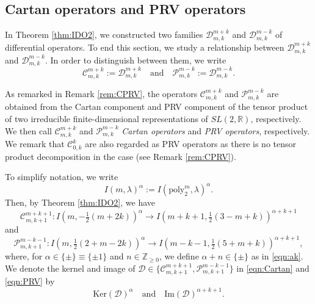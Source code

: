 \documentclass[reqno,11pt]{amsart}
\theoremstyle{remark}
\numberwithin{equation}{section}
\newcommand{\ga}{\alpha}
\newcommand{\R}{\mathbb{R}}
\newcommand{\Z}{\mathbb{Z}}
\newcommand{\Cal}{\mathcal}
\renewcommand{\Im}{\mathrm{Im}}
\newcommand{\poly}{\mathrm{poly}}
\newcommand{\To}{\longrightarrow}
\newcommand{\D}{\Cal{D}}
\newcommand{\Ker}{\mathrm{Ker}}
\begin{document}
\subsection{Cartan operators and PRV operators}
\label{sec:comp}
In Theorem \ref{thm:IDO2}, we constructed two families
$\Cal{D}^{m+k}_{m,k}$ and $\Cal{D}^{m-k}_{m,k}$ of differential operators. 
To end this section, we study a relationship between
$\Cal{D}^{m+k}_{m,k}$ and $\Cal{D}^{m-k}_{m,k}$.
In order to distinguish between them,
we write
\begin{equation}\label{eqn:CPdef}
\Cal{C}^{m+k}_{m,k}:=\Cal{D}^{m+k}_{m,k}
\quad
\text{and}
\quad
\Cal{P}^{m-k}_{m,k}:=\Cal{D}^{m-k}_{m,k}.
\end{equation}

As remarked in Remark \ref{rem:CPRV}, the operators 
$\Cal{C}^{m+k}_{m,k}$ and $\Cal{P}^{m-k}_{m,k}$ are obtained 
from the Cartan component and PRV component of 
the tensor product of two irreducible finite-dimensional representations of $SL(2,\R)$,
respectively. We then call $\Cal{C}^{m+k}_{m,k}$ and $\Cal{P}^{m-k}_{m,k}$
\emph{Cartan operators} and \emph{PRV operators}, respectively.
We remark that $\Cal{C}^{k}_{0,k}$ are also regarded as PRV operators
as there is no tensor product decomposition in the case (see Remark \ref{rem:CPRV}).

To simplify notation, we write
\begin{equation}\label{eqn:Ind}
I(m,\lambda)^\ga:=I(\poly^m_2,\lambda)^\ga.
\end{equation}
Then, by Theorem \ref{thm:IDO2}, we have
\begin{equation}\label{eqn:Cartan}
\Cal{C}^{m+k+1}_{m,k+1}\colon I(m, -\tfrac{1}{2}(m+2k))^\ga
\To
I(m+k+1, \tfrac{1}{2}(3-m+k))^{\ga+k+1}
\end{equation}
and
\begin{equation}\label{eqn:PRV}
\Cal{P}^{m-k-1}_{m,k+1}\colon I(m, \tfrac{1}{2}(2+m-2k))^\ga
\To
I(m-k-1, \tfrac{1}{2}(5+m+k))^{\ga+k+1},
\end{equation}
where, for $\ga \in \{\pm\}\equiv \{\pm 1\}$ 
and $n \in \Z_{\geq 0}$, we define
$\ga + n \in \{\pm\}$ as in \eqref{eqn:ak}.
We denote the kernel and image of
 $\D \in \{\Cal{C}^{m+k+1}_{m,k+1}, \Cal{P}^{m-k-1}_{m,k+1}\}$
in \eqref{eqn:Cartan} 
and \eqref{eqn:PRV}  by 
\begin{equation*}
\Ker(\D)^\ga
\quad
\text{and}
\quad
\Im(\D)^{\ga+k+1}.
\end{equation*}
\end{document}
